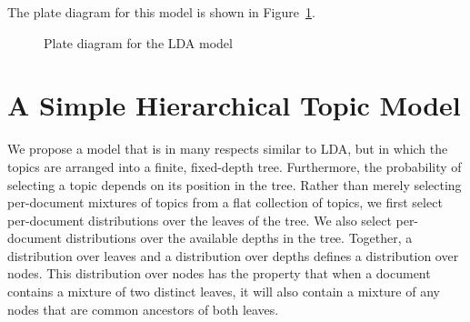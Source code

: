 \documentclass{article}
\begin{document}
The plate diagram for this model is shown in Figure~\ref{fig:plate-lda}.

\begin{figure}[htb]
%
\centering
{}
%
\caption{Plate diagram for the LDA model}
\label{fig:plate-lda}
\end{figure}

\section{A Simple Hierarchical Topic Model}

We propose a model that is in many respects similar to LDA, but in which the topics are arranged into a finite, fixed-depth tree.
Furthermore, the probability of selecting a topic depends on its position in the tree.
Rather than merely selecting per-document mixtures of topics from a flat collection of topics, we first select per-document distributions over the leaves of the tree.
We also select per-document distributions over the available depths in the tree.
Together, a distribution over leaves and a distribution over depths defines a distribution over nodes.
This distribution over nodes has the property that when a document contains a mixture of two distinct leaves, it will also contain a mixture of any nodes that are common ancestors of both leaves.
\end{document}
